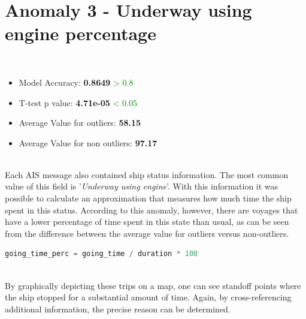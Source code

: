 \clearpage

\section{Anomaly 3 - Underway using engine percentage}
\label{sec:anomaly-3}

\\

\begin{itemize}
\item Model Accuracy: \textbf{0.8649} \textcolor{green}{> 0.8}
\item T-test p value: \textbf{4.71e-05} \textcolor{green}{< 0.05}
\item Average Value for outliers: \textbf{58.15}
\item Average Value for non outliers: \textbf{97.17}
\end{itemize}
\\

Each AIS message also contained ship status information. The most common value of this field is '\textit{Underway using engine}'. With this information it was possible to calculate an approximation that measures how much time the ship spent in this status.
According to this anomaly, however, there are voyages that have a lower percentage of time spent in this state than usual, as can be seen from the difference between the average value for outliers versus non-outliers.
\\
\begin{lstlisting}[language=Python]
    going_time_perc = going_time / duration * 100
\end{lstlisting} 
\\
By graphically depicting these trips on a map, one can see standoff points where the ship stopped for a substantial amount of time. Again, by cross-referencing additional information, the precise reason can be determined.


